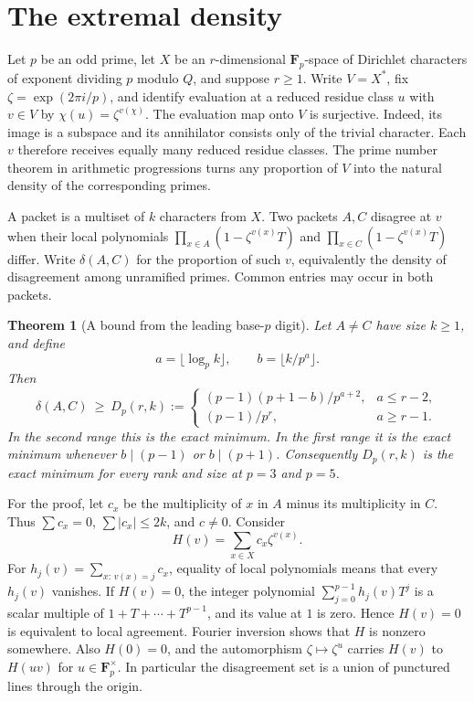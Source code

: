 \documentclass[11pt,letterpaper]{article}
\newcommand{\Fp}{\mathbf F_p}
\newtheorem{theorem}{Theorem}[section]
\theoremstyle{remark}
\begin{document}
\section{The extremal density}

Let $p$ be an odd prime, let $X$ be an $r$-dimensional $\Fp$-space of Dirichlet characters of exponent dividing $p$ modulo $Q$, and suppose $r\ge1$. Write $V=X^*$, fix $\zeta=\exp(2\pi i/p)$, and identify evaluation at a reduced residue class $u$ with $v\in V$ by $\chi(u)=\zeta^{v(\chi)}$. The evaluation map onto $V$ is surjective. Indeed, its image is a subspace and its annihilator consists only of the trivial character. Each $v$ therefore receives equally many reduced residue classes. The prime number theorem in arithmetic progressions turns any proportion of $V$ into the natural density of the corresponding primes.

A packet is a multiset of $k$ characters from $X$. Two packets $A,C$ disagree at $v$ when their local polynomials $\prod_{x\in A}(1-\zeta^{v(x)}T)$ and $\prod_{x\in C}(1-\zeta^{v(x)}T)$ differ. Write $\delta(A,C)$ for the proportion of such $v$, equivalently the density of disagreement among unramified primes. Common entries may occur in both packets.

\begin{theorem}[A bound from the leading base-$p$ digit]\label{thm:digit}
Let $A\ne C$ have size $k\ge1$, and define
\[
 a=\lfloor\log_p k\rfloor,\qquad b=\lfloor k/p^a\rfloor .
\]
Then
\[
 \delta(A,C)\ \ge\ D_p(r,k):=
 \begin{cases}
 (p-1)(p+1-b)/p^{a+2},& a\le r-2,\\[2pt]
 (p-1)/p^r,&a\ge r-1.
 \end{cases}
\]
In the second range this is the exact minimum. In the first range it is the exact minimum whenever $b\mid(p-1)$ or $b\mid(p+1)$. Consequently $D_p(r,k)$ is the exact minimum for every rank and size at $p=3$ and $p=5$.
\end{theorem}

For the proof, let $c_x$ be the multiplicity of $x$ in $A$ minus its multiplicity in $C$. Thus $\sum c_x=0$, $\sum |c_x|\le 2k$, and $c\ne0$. Consider
\[
 H(v)=\sum_{x\in X}c_x\zeta^{v(x)} .
\]
For $h_j(v)=\sum_{x:\,v(x)=j}c_x$, equality of local polynomials means that every $h_j(v)$ vanishes. If $H(v)=0$, the integer polynomial $\sum_{j=0}^{p-1}h_j(v)T^j$ is a scalar multiple of $1+T+\cdots+T^{p-1}$, and its value at $1$ is zero. Hence $H(v)=0$ is equivalent to local agreement. Fourier inversion shows that $H$ is nonzero somewhere. Also $H(0)=0$, and the automorphism $\zeta\mapsto\zeta^u$ carries $H(v)$ to $H(uv)$ for $u\in\Fp^\times$. In particular the disagreement set is a union of punctured lines through the origin.
\end{document}
